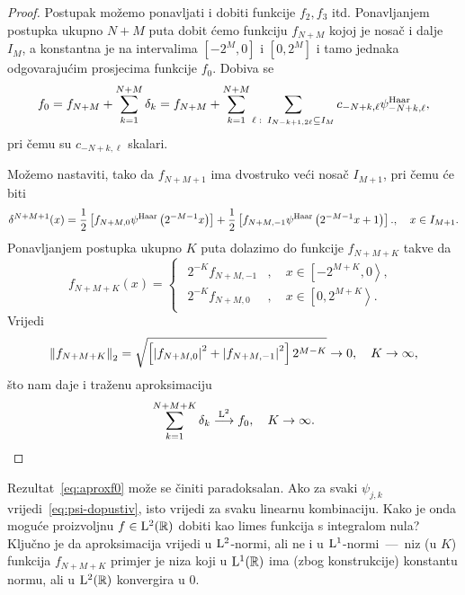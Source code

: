 \documentclass[main.tex]{subfiles}
\begin{document}
\begin{proof}
	Postupak možemo ponavljati i dobiti funkcije \( f_2, f_3 \) itd. Ponavljanjem
	postupka ukupno \( N+M \) puta dobit ćemo funkciju \( f_{N+M} \)
	kojoj je nosač i dalje \( I_M \), a konstantna je na intervalima
	\( \left[ -2^M,0 \right] \) i \( \left[ 0,2^M \right] \)
	i tamo jednaka odgovarajućim prosjecima funkcije \( f_0 \).
	Dobiva se
	\begin{equation}
		f_0 = f_{N+M} + \sum_{k=1}^{N+M} \delta_k
		= f_{N+M} + \sum_{k=1}^{N+M} \sum_{\ell \, \colon \, I_{N-k+1, 2\ell} \subseteq I_M}
		c_{-N+k, \ell} \psi^{\mathrm{Haar}}_{-N+k,\ell},
	\end{equation}
	pri čemu su \( c_{-N+k,\ell} \) skalari.

	Možemo nastaviti, tako da \( f_{N+M+1} \) ima
	dvostruko veći nosač \( I_{M+1} \), pri čemu će biti
	\[ \delta^{N+M+1}(x) = \frac12 \left[ f_{N+M,0} \psi^{\mathrm{Haar}}\left( 2^{-M-1}x \right) \right]
		+ \frac 12 \left[ f_{N+M,-1}\psi^{\mathrm{Haar}}\left( 2^{-M-1}x + 1 \right) \right].,
		\quad x \in I_{M+1}.\]
	Ponavljanjem postupka ukupno \( K \) puta dolazimo do funkcije
	\( f_{N+M+K} \) takve da
	\begin{equation}
		f_{N+M+K}(x) = \begin{cases}
			\begin{aligned}
				2^{-K}f_{N+M,-1} & , \quad  x \in  \left[ -2^{M+K}, 0 \right\rangle, \\
				2^{-K}f_{N+M,0}  & , \quad x \in \left[ 0, 2^{M+K} \right\rangle.
			\end{aligned}
		\end{cases}
	\end{equation}
	Vrijedi \begin{equation} \left\lVert f_{N+M+K}\right\rVert_2 = \sqrt{\left[ \left| {f_{N+M,0}} \right|^2+\left| {f_{N+M,-1}} \right|^2 \right] 2^{M-K}} \rightarrow 0, \quad K \rightarrow \infty,
	\end{equation}
	što nam daje i traženu aproksimaciju
	\begin{equation}\label{eq:aproxf0}
		\sum_{k=1}^{N+M+K} \delta_k \stackrel{\mathrm{L}^2}{\longrightarrow} f_0, \quad K \rightarrow \infty.
	\end{equation}
\end{proof}

\begin{komentar}
	Rezultat~\eqref{eq:aproxf0} može se činiti paradoksalan.
	Ako za svaki \( \psi_{j,k} \) vrijedi~\eqref{eq:psi-dopustiv},
	isto vrijedi za svaku linearnu kombinaciju. Kako je onda moguće proizvoljnu
	\( f \in \mathrm{L}^2(\mathbb{R}) \) dobiti kao limes funkcija s integralom nula?
	Ključno je da aproksimacija vrijedi u \( \mathrm{L}^2 \)-normi,
	ali ne i u \( \mathrm{L}^1 \)-normi~---~niz (u \(K\)) funkcija \( f_{N+M+K} \)
	primjer je niza koji u \( \mathrm{L}^1(\mathbb{R}) \) ima (zbog konstrukcije) konstantu normu, ali u \( \mathrm{L}^2(\mathbb{R}) \)
	konvergira u \( 0 \).
\end{komentar}
\end{document}
